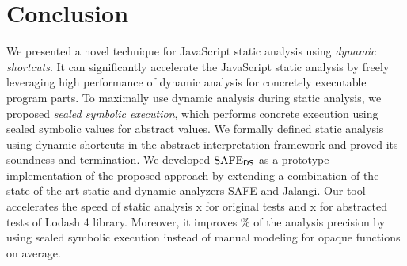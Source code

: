 \section{Conclusion}\label{sec:conclusion}
We presented a novel technique for JavaScript static analysis using \textit{dynamic shortcuts}.
It can significantly accelerate the JavaScript static
analysis by freely leveraging high performance of dynamic analysis for
concretely executable program parts.  To maximally use dynamic analysis during static analysis,
we proposed \textit{sealed symbolic execution}, which performs
concrete execution using sealed symbolic values for abstract values.
We formally defined static analysis using dynamic shortcuts in the
abstract interpretation framework and proved its soundness and termination.
We developed $\text{SAFE}_{\textsf{DS}}$ as a prototype implementation of the proposed approach
by extending a combination of the state-of-the-art static and dynamic
analyzers SAFE and Jalangi.  Our tool accelerates the speed
of static analysis x for original tests and x for
abstracted tests of Lodash 4 library.  Moreover, it improves \% of
the analysis precision by using sealed symbolic execution instead of
manual modeling for  opaque functions on average.
